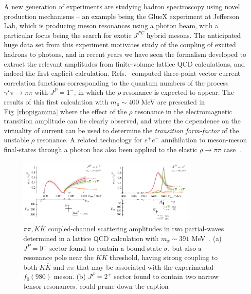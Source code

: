{A new generation of experiments are studying hadron spectroscopy using novel production mechanisms -- an example being the GlueX experiment at Jefferson Lab, which is producing meson resonances using a photon beam, with a particular focus being the search for exotic $J^{PC}$ hybrid mesons. The anticipated huge data set from this experiment motivates study of the coupling of excited hadrons to photons, and in recent years we have seen the formalism developed to extract the relevant amplitudes from finite-volume lattice QCD calculations, and indeed the first explicit calculation. Refs.~\cite{Briceno:2015dca,Briceno:2016kkp} computed three-point vector current correlation   functions corresponding to the quantum numbers of the process $\gamma^\star \pi \to \pi \pi$ with $J^P=1^-$, in which the $\rho$ resonance is expected to appear. The results of this first calculation with $m_\pi \sim 400$ MeV are presented in Fig~\ref{rhopigamma} where the effect of the $\rho$ resonance in the electromagnetic transition amplitude can be clearly observed, and where the dependence on the virtuality of current can be used to determine the \emph{transition form-factor} of the unstable $\rho$ resonance. A related technology for $e^+ e^-$ annihilation to meson-meson final-states through a photon has also been applied to the elastic $\rho \to \pi\pi$ case~\cite{Feng:2014gba}.

 
\begin{figure}
\includegraphics[width=0.8\textwidth]{dudek/f0f2}
\caption{$\pi\pi, K\overline{K}$ coupled-channel scattering amplitudes in two partial-waves determined in a lattice QCD calculation with $m_\pi \sim 391$ MeV~\cite{Briceno:2017qmb}. (a) $J^P=0^+$ sector found to contain a bound-state $\sigma$, but also a resonance pole near the $K\overline{K}$ threshold, having strong coupling to both $K\overline{K}$ and $\pi\pi$ that may be associated with the experimental $f_0(980)$ meson. (b) $J^P=2^+$ sector found to contain two narrow tensor resonances. {\color{red} could prune down the caption}}
\label{f0f2}
\end{figure}


}
